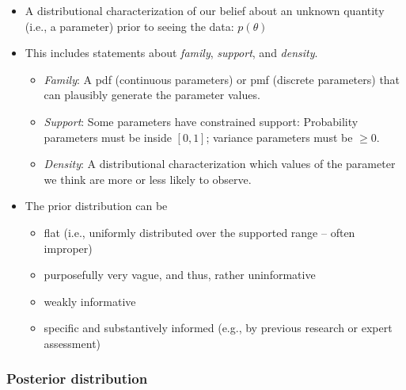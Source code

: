 \documentclass[
  11pt,
]{article}
\providecommand{\tightlist}{%
  \setlength{\itemsep}{0pt}\setlength{\parskip}{0pt}}
\begin{document}
\begin{itemize}
\tightlist
\item
  A distributional characterization of our belief about an unknown quantity (i.e., a parameter) prior to seeing the data: \(p(\theta)\)
\item
  This includes statements about \emph{family}, \emph{support}, and \emph{density}.

  \begin{itemize}
  \tightlist
  \item
    \emph{Family}: A pdf (continuous parameters) or pmf (discrete parameters) that can plausibly generate the parameter values.
  \item
    \emph{Support}: Some parameters have constrained support: Probability parameters must be inside \([0, 1]\); variance parameters must be \(\geq 0\).
  \item
    \emph{Density}: A distributional characterization which values of the parameter we think are more or less likely to observe.
  \end{itemize}
\item
  The prior distribution can be

  \begin{itemize}
  \tightlist
  \item
    flat (i.e., uniformly distributed over the supported range -- often improper)
  \item
    purposefully very vague, and thus, rather uninformative
  \item
    weakly informative
  \item
    specific and substantively informed (e.g., by previous research or expert assessment)
  \end{itemize}
\end{itemize}

\hypertarget{posterior-distribution}{%
\subsubsection{Posterior distribution}\label{posterior-distribution}}
\end{document}
